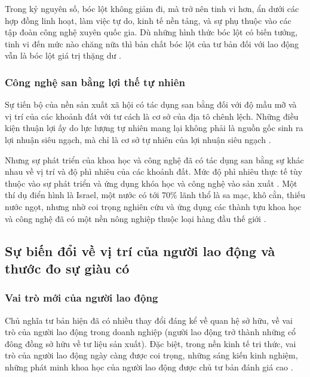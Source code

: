 Trong kỷ nguyên số, bóc lột không giảm đi, mà trở nên tinh vi hơn, ẩn dưới các hợp đồng linh hoạt, làm việc tự do, kinh tế nền tảng, và sự phụ thuộc vào các tập đoàn công nghệ xuyên quốc gia. Dù những hình thức bóc lột có biến tướng, tinh vi đến mức nào chăng nữa thì bản chất bóc lột của tư bản đối với lao động vẫn là bóc lột giá trị thặng dư \cite{tran_hieu_gttd}.

\subsubsection{Công nghệ san bằng lợi thế tự nhiên}

Sự tiến bộ của nền sản xuất xã hội có tác dụng san bằng đối với độ mầu mỡ và vị trí của các khoảnh đất với tư cách là cơ sở của địa tô chênh lệch. Những điều kiện thuận lợi ấy do lực lượng tự nhiên mang lại không phải là nguồn gốc sinh ra lợi nhuận siêu ngạch, mà chỉ là cơ sở tự nhiên của lợi nhuận siêu ngạch \cite{do_the_tung_gttd, marx_toantp_t25p2}.

Nhưng sự phát triển của khoa học và công nghệ đã có tác dụng san bằng sự khác nhau về vị trí và độ phì nhiêu của các khoảnh đất. Mức độ phì nhiêu thực tế tùy thuộc vào sự phát triển và ứng dụng khóa học và công nghệ vào sản xuất \cite{do_the_tung_gttd, marx_toantp_t25p2}. Một thí dụ điển hình là Israel, một nước có tới 70\% lãnh thổ là sa mạc, khô cằn, thiếu nước ngọt, nhưng nhờ coi trọng nghiên cứu và ứng dụng các thành tựu khoa học và công nghệ đã có một nền nông nghiệp thuộc loại hàng đầu thế giới \cite{do_the_tung_gttd}.

\subsection{Sự biến đổi về vị trí của người lao động và thước đo sự giàu có}

\subsubsection{Vai trò mới của người lao động}

Chủ nghĩa tư bản hiện đã có nhiều thay đổi đáng kể về quan hệ sở hữu, về vai trò của người lao động trong doanh nghiệp (người lao động trở thành những cổ đông đồng sở hữu về tư liệu sản xuất). Đặc biệt, trong nền kinh tế tri thức, vai trò của người lao động ngày càng được coi trọng, những sáng kiến kinh nghiệm, những phát minh khoa học của người lao động được chủ tư bản đánh giá cao \cite{tapchi_congthuong_gttd}.

